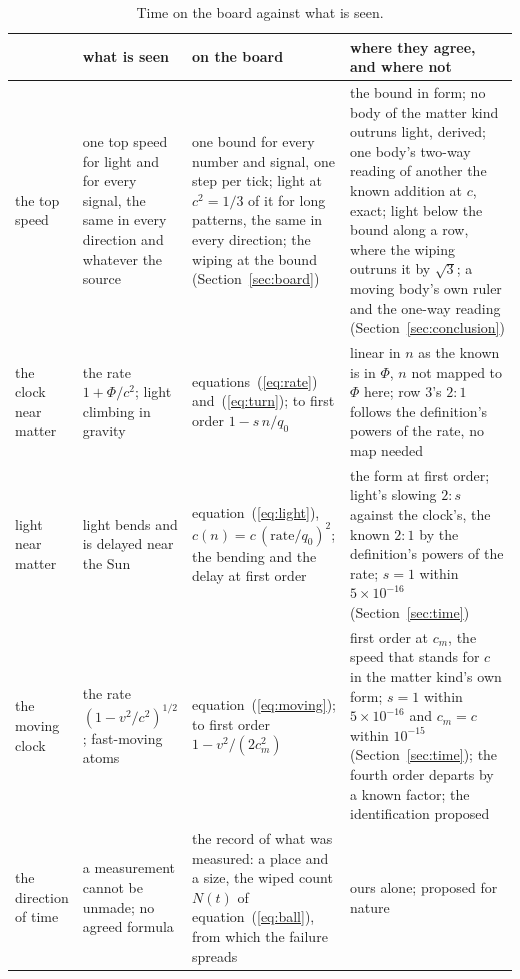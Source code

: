 \documentclass[pdflatex,sn-mathphys-num]{sn-jnl}
\begin{document}
\begin{table}[!t]\caption{\label{tab:seen}Time on the board against what is seen.}
\footnotesize\setlength{\tabcolsep}{2pt}\renewcommand{\arraystretch}{1.0}\begin{tabular}{>{\raggedright\arraybackslash}p{1.3cm}>{\raggedright\arraybackslash}p{2.35cm}>{\raggedright\arraybackslash}p{3.45cm}>{\raggedright\arraybackslash}p{5.2cm}}
\toprule
 & what is seen & on the board & where they agree, and where not \\
\midrule
the top speed & one top speed for light and for every signal, the same in every direction and whatever the source \cite{brecher1977} & one bound for every number and signal, one step per tick; light at $c^2 = 1/3$ of it for long patterns, the same in every direction; the wiping at the bound (Section~\ref{sec:board}) & the bound in form; no body of the matter kind outruns light, derived; one body's two-way reading of another the known addition at $c$, exact; light below the bound along a row, where the wiping outruns it by $\sqrt3$; a moving body's own ruler \cite{michelson1887} and the one-way reading (Section~\ref{sec:conclusion}) \\
the clock near matter & the rate $1 + \Phi/c^2$; light climbing in gravity \cite{pound1960,einstein1911} & equations~(\ref{eq:rate}) and~(\ref{eq:turn}); to first order $1 - s\,n/q_0$ & linear in $n$ as the known is in $\Phi$, $n$ not mapped to $\Phi$ here; row 3's $2 : 1$ follows the definition's powers of the rate, no map needed \\
light near matter & light bends and is delayed near the Sun \cite{dyson1920,shapiro1964} & equation~(\ref{eq:light}), $c(n) = c\,(\mathrm{rate}/q_0)^2$; the bending and the delay at first order & the form at first order; light's slowing $2 : s$ against the clock's, the known $2 : 1$ by the definition's powers of the rate; $s = 1$ within $5 \times 10^{-16}$ (Section~\ref{sec:time}) \\
the moving clock & the rate $(1 - v^2/c^2)^{1/2}$; fast-moving atoms \cite{ives1938,einstein1905} & equation~(\ref{eq:moving}); to first order $1 - v^2/(2c_m^2)$ & first order at $c_m$, the speed that stands for $c$ in the matter kind's own form; $s = 1$ within $5 \times 10^{-16}$ and $c_m = c$ within $10^{-15}$ (Section~\ref{sec:time}); the fourth order departs by a known factor; the identification proposed \\
the direction of time & a measurement cannot be unmade; no agreed formula & the record of what was measured: a place and a size, the wiped count $N(t)$ of equation~(\ref{eq:ball}), from which the failure spreads & ours alone; proposed for nature \\
\bottomrule
\end{tabular}
\end{table}
\end{document}
